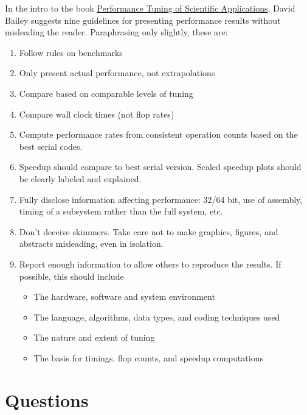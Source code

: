 \documentclass[12pt, leqno]{article} %
\begin{document}
In the intro to the book
\href{http://www.lifescied.org/content/13/2/179.abstract}{Performance
Tuning of Scientific Applications}, David Bailey suggests nine
guidelines for presenting performance results without misleading the
reader. Paraphrasing only slightly, these are:

\begin{enumerate}
\item
  Follow rules on benchmarks
\item
  Only present actual performance, not extrapolations
\item
  Compare based on comparable levels of tuning
\item
  Compare wall clock times (not flop rates)
\item
  Compute performance rates from consistent operation counts based on
  the best serial codes.
\item
  Speedup should compare to best serial version. Scaled speedup plots
  should be clearly labeled and explained.
\item
  Fully disclose information affecting performance: 32/64 bit, use of
  assembly, timing of a subsystem rather than the full system, etc.
\item
  Don't deceive skimmers. Take care not to make graphics, figures, and
  abstracts misleading, even in isolation.
\item
  Report enough information to allow others to reproduce the results. If
  possible, this should include
\begin{itemize}
\item
  The hardware, software and system environment
\item
  The language, algorithms, data types, and coding techniques used
\item
  The nature and extent of tuning
\item
  The basis for timings, flop counts, and speedup computations
\end{itemize}
\end{enumerate}


\section{Questions}
\end{document}
